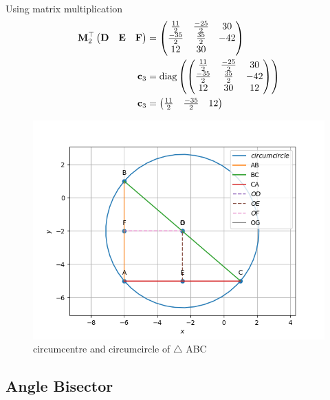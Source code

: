 \documentclass[11pt]{book}
\begin{document}
\begin{enumerate}[label=\thesubsection.\arabic*.,ref=\thesubsection.\theenumi]
\begin{align}
\end{align}
Using matrix multiplication
\begin{align}
 \mathbf{M}_2^{\top}\begin{pmatrix}\mathbf{D} & \mathbf{E} &\mathbf{F}\end{pmatrix} &=\begin{pmatrix} \frac{11}{2} & \frac{-25}{2} & 30 \\ \frac{-35}{2} & \frac{35}{2} & -42 \\ 12 & 30 &  \end{pmatrix} \\
    \mathbf{c}_3 &= \text{diag}\left( \begin{pmatrix} \frac{11}{2} & \frac{-25}{2} & 30 \\ \frac{-35}{2} & \frac{35}{2} & -42 \\ 12 & 30 & 12 \end{pmatrix} \right) \\
 \mathbf{c}_3   &= \begin{pmatrix} \frac{11}{2} & \frac{-35}{2} & 12\end{pmatrix}
\end{align}
\begin{figure}[H]
    \centering
    \includegraphics{figs/circumference.png}
    \caption{circumcentre and circumcircle of $\triangle$ ABC}
    \label{fig:mat_perp2}
\end{figure}
\end{enumerate}


\subsection{Angle Bisector}
\end{document}
